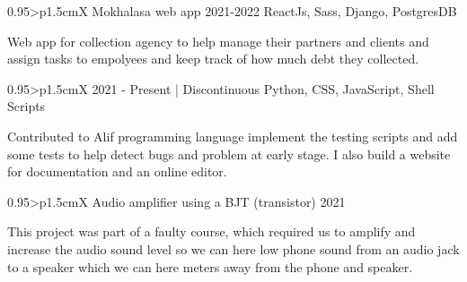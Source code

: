 \documentclass[a4paper, oneside, final]{scrartcl} %
\begin{document}
\begin{center}
\begin{paracol}{2}
\begin{tabularx}{0.95\linewidth}{>{\raggedleft\scshape}p{1.5cm}X}
 {Mokhalasa web app}
 {2021-2022}
 {ReactJs, Sass, Django, PostgresDB}
\end{tabularx}

\vspace{2mm}
\parbox{0.95\linewidth}{%
Web app for  collection agency to help manage their partners and clients and assign tasks to empolyees and keep track of how much debt they collected.
}%

\vspace{20pt}

\begin{tabularx}{0.95\linewidth}{>{\raggedleft\scshape}p{1.5cm}X}
 {}
 {2021 - Present \scriptsize{| Discontinuous}}
 {Python, CSS, JavaScript, Shell Scripts}
\end{tabularx}

\vspace{2mm}
\parbox{0.95\linewidth}{%
Contributed to Alif programming language implement the testing scripts and add some tests to help detect bugs and problem at early stage. I also build a website for documentation and an online editor.
}%


\switchcolumn


\begin{tabularx}{0.95\linewidth}{>{\raggedleft\scshape}p{1.5cm}X}
 {Audio amplifier using a BJT (transistor)}
 {2021}
\end{tabularx}

\vspace{2mm}
\parbox{0.95\linewidth}{%
This project was part of a faulty course, which required us to amplify and increase the audio sound level so we can here low phone sound from an audio jack to a speaker which we can here meters away from the phone and speaker.
}%

\vspace{20pt}

\vspace{20pt}


\end{paracol}
\end{center}
\end{document}
